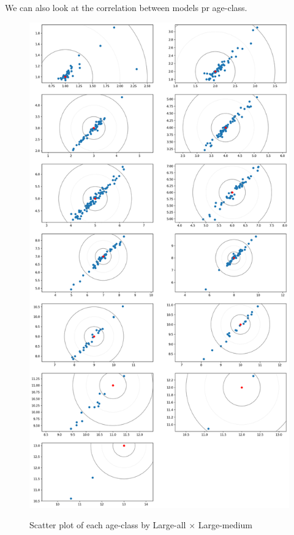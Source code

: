 \documentclass[10pt,letterpaper]{article}
\begin{document}
We can also look at the correlation between models pr age-class.
\begin{figure}[h!]
  \caption{Scatter plot of each age-class by Large-all $\times$ Large-medium}
  \centering
  \includegraphics[scale=0.45]{results/eda/l_all_x_l_middle.png}
  \label{marker11}
\end{figure}
\end{document}
